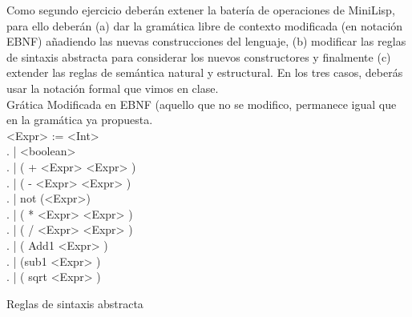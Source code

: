 \documentclass[12pt,letterpaper]{article}
\begin{document}
\hspace{1 cm}Como segundo ejercicio deberán extener la batería de operaciones de MiniLisp, para ello deberán (a) dar la gramática libre de contexto modificada (en notación EBNF) añadiendo las nuevas construcciones del lenguaje, (b) modificar las reglas de sintaxis abstracta para considerar los nuevos constructores y finalmente (c) extender las reglas de semántica natural y estructural. En los tres casos, deberás usar la notación formal que vimos en clase.
\vspace{1 cm} \\ Grática Modificada en EBNF (aquello que no se modifico, permanece igual que en la gramática ya propuesta.
\\ <Expr> := <Int> \\ . \hspace{1.5 cm} | <boolean> \\ . \hspace{1.5 cm} | ( + <Expr>  \space <Expr> ) \\ . \hspace{1.5 cm} | ( - <Expr> \space <Expr> ) \\ . \hspace{1.5 cm} | not (<Expr>)\\ . \hspace{1.5 cm} | ( * <Expr>  \space <Expr> ) \\ . \hspace{1.5 cm} | ( / <Expr> \space  <Expr> ) \\ . \hspace{1.5 cm} | ( Add1 <Expr> ) \\ . \hspace{1.5 cm} | (sub1 <Expr> ) \\ . \hspace{1.5 cm} | ( sqrt <Expr> ) 

 \vspace{1 cm}Reglas de sintaxis abstracta

 \begin{prooftree}
     \end{prooftree}

 \begin{prooftree}
     \end{prooftree}

 \begin{prooftree}
     \end{prooftree}
\end{document}
